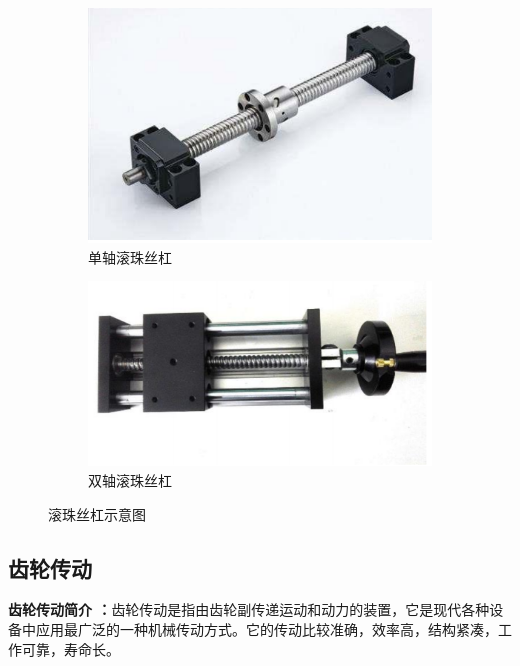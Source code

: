 \documentclass[UTF8]{article} %
\begin{document}
\begin{figure}[H]
  \centering
  \begin{subfigure}[b]{0.35\textwidth}
         \centering
         \includegraphics[width=\textwidth]{g1.png}
          \caption{单轴滚珠丝杠}
  \end{subfigure}
  \quad
  \begin{subfigure}[b]{0.4\textwidth}
          \centering
          \includegraphics[width=\textwidth]{g2.png}
          \caption{双轴滚珠丝杠}
  \end{subfigure}
  \caption{滚珠丝杠示意图}
\end{figure}

\subsection{齿轮传动}
\textbf{齿轮传动简介 ：}齿轮传动是指由齿轮副传递运动和动力的装置，它是现代各种设备中应用最广泛的一种机械传动方式。它的传动比较准确，效率高，结构紧凑，工作可靠，寿命长。
\end{document}
